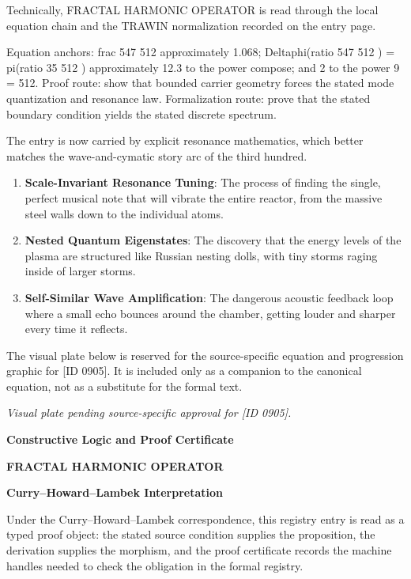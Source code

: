 Technically, FRACTAL HARMONIC OPERATOR is read through the local equation chain and the TRAWIN normalization recorded on the entry page.

Equation anchors: frac 547 512 approximately 1.068; Deltaphi(ratio 547 512 ) = pi(ratio 35 512 ) approximately 12.3 to the power compose; and 2 to the power 9 = 512. Proof route: show that bounded carrier geometry forces the stated mode quantization and resonance law. Formalization route: prove that the stated boundary condition yields the stated discrete spectrum.

The entry is now carried by explicit resonance mathematics, which better matches the wave-and-cymatic story arc of the third hundred.
\endgroup

\begin{enumerate}[leftmargin=1.6em,itemsep=6pt,topsep=4pt]
\item \textbf{Scale-Invariant Resonance Tuning}: The process of finding the single, perfect musical note that will vibrate the entire reactor, from the massive steel walls down to the individual atoms.
\item \textbf{Nested Quantum Eigenstates}: The discovery that the energy levels of the plasma are structured like Russian nesting dolls, with tiny storms raging inside of larger storms.
\item \textbf{Self-Similar Wave Amplification}: The dangerous acoustic feedback loop where a small echo bounces around the chamber, getting louder and sharper every time it reflects.
\end{enumerate}

\begingroup\footnotesize\sloppy
The visual plate below is reserved for the source-specific equation and progression graphic for [ID 0905]. It is included only as a companion to the canonical equation, not as a substitute for the formal text.
\par\endgroup
\begingroup\footnotesize\itshape
Visual plate pending source-specific approval for [ID 0905].
\par\endgroup

\clearpage
\begingroup\tzpsupportsetup
\noindent\textbf{\fontsize{10.8pt}{12.8pt}\selectfont [ID 0905] Constructive Logic and Proof Certificate}\par
\noindent\textbf{\fontsize{10pt}{12pt}\selectfont FRACTAL HARMONIC OPERATOR}\par
\vspace{0.45em}
\begingroup
\footnotesize
\setlength{\parskip}{0.22em}
\setlength{\parindent}{0pt}
\noindent\textbf{Curry--Howard--Lambek Interpretation}\par
Under the Curry--Howard--Lambek correspondence, this registry entry is read as a typed proof
object: the stated source condition supplies the proposition, the derivation supplies the
morphism, and the proof certificate records the machine handles needed to check the obligation
in the formal registry.

